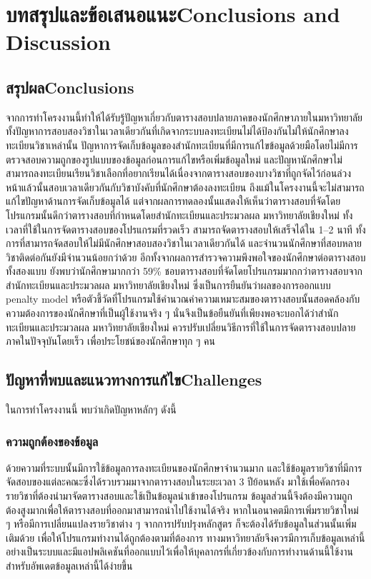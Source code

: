 \chapter{\ifcpe บทสรุปและข้อเสนอแนะ\else Conclusions and Discussion\fi}

\section{\ifcpe สรุปผล\else Conclusions\fi}

จากการทำโครงงานนี้ทำให้ได้รับรู้ปัญหาเกี่ยวกับตารางสอบปลายภาคของนักศึกษาภายในมหาวิทยาลัย
ทั้งปัญหาการสอบสองวิชาในเวลาเดียวกันที่เกิดจากระบบลงทะเบียนไม่ได้ป้องกันไม่ให้นักศึกษาลงทะเบียนวิชาเหล่านั้น
ปัญหาการจัดเก็บข้อมูลของสำนักทะเบียนที่มีการแก้ไขข้อมูลด้วยมือโดยไม่มีการตรวจสอบความถูกของรูปแบบของข้อมูลก่อนการแก้ไขหรือเพิ่มข้อมูลใหม่
และปัญหานักศึกษาไม่สามารถลงทะเบียนเรียนวิชาเลือกที่อยากเรียนได้เนื่องจากตารางสอบของบางวิชาที่ถูกจัดไว้ก่อนล่วงหน้าแล้วนั้นสอบเวลาเดียวกันกับวิชาบังคับที่นักศึกษาต้องลงทะเบียน
ถึงแม้ในโครงงานนี้จะไม่สามารถแก้ไขปัญหาด้านการจัดเก็บข้อมูลได้ แต่จากผลการทดลองนั้นแสดงให้เห็นว่าตารางสอบที่จัดโดยโปรแกรมนั้นดีกว่าตารางสอบที่กำหนดโดยสำนักทะเบียนและประมวลผล มหาวิทยาลัยเชียงใหม่
ทั้งเวลาที่ใช้ในการจัดตารางสอบของโปรแกรมที่รวดเร็ว สามารถจัดตารางสอบให้เสร็จได้ใน 1--2 นาที ทั้งการที่สามารถจัดสอบให้ไม่มีนักศึกษาสอบสองวิชาในเวลาเดียวกันได้
และจำนวนนักศึกษาที่สอบหลายวิชาติดต่อกันยังมีจำนวนน้อยกว่าด้วย อีกทั้งจากผลการสำรวจความพึงพอใจของนักศึกษาต่อตารางสอบทั้งสองแบบ ยังพบว่านักศึกษามากกว่า 59\%
ชอบตารางสอบที่จัดโดยโปรแกรมมากกว่าตารางสอบจากสำนักทะเบียนและประมวลผล มหาวิทยาลัยเชียงใหม่ ซึ่งเป็นการยืนยันว่าผลของการออกแบบ penalty model
หรือตัวชี้วัดที่โปรแกรมใช้คำนวณค่าความเหมาะสมของตารางสอบนั้นสอดคล้องกับความต้องการของนักศึกษาที่เป็นผู้ใช้งานจริง ๆ นั่นจึงเป็นข้อยืนยันที่เพียงพอจะบอกได้ว่าสำนักทะเบียนและประมวลผล มหาวิทยาลัยเชียงใหม่
ควรปรับเปลี่ยนวิธีการที่ใช้ในการจัดตารางสอบปลายภาคในปัจจุบันโดยเร็ว เพื่อประโยชน์ของนักศึกษาทุก ๆ คน

\section{\ifcpe ปัญหาที่พบและแนวทางการแก้ไข\else Challenges\fi}

ในการทำโครงงานนี้ พบว่าเกิดปัญหาหลักๆ ดังนี้
\subsection{ความถูกต้องของข้อมูล}
ด้วยความที่ระบบนั้นมีการใช้ข้อมูลการลงทะเบียนของนักศึกษาจำนวนมาก และใช้ข้อมูลรายวิชาที่มีการจัดสอบของแต่ละคณะซึ่งได้รวบรวมมาจากตารางสอบในระยะเวลา 3 ปีย้อนหลัง มาใช้เพื่อคัดกรองรายวิชาที่ต้องนำมาจัดตารางสอบและใช้เป็นข้อมูลนำเข้าของโปรแกรม ข้อมูลส่วนนี้จึงต้องมีความถูกต้องสูงมากเพื่อให้ตารางสอบที่ออกมาสามารถนำไปใช้งานได้จริง  หากในอนาคตมีการเพิ่มรายวิชาใหม่ ๆ หรือมีการเปลี่ยนแปลงรายวิชาต่าง ๆ จากการปรับปรุงหลักสูตร ก็จะต้องได้รับข้อมูลในส่วนนั้นเพิ่มเติมด้วย เพื่อให้โปรแกรมทำงานได้ถูกต้องตามที่ต้องการ 
ทางมหาวิทยาลัยจึงควรมีการเก็บข้อมูลเหล่านี้อย่างเป็นระบบและมีแอปพลิเคชันที่ออกแบบไว้เพื่อให้บุคลากรที่เกี่ยวข้องกับการทำงานด้านนี้ใช้งานสำหรับอัพเดตข้อมูลเหล่านี้ได้ง่ายขึ้น

